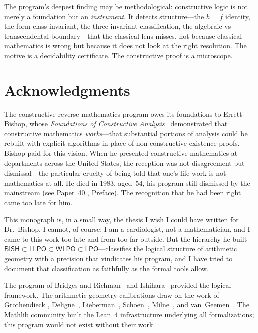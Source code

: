 \documentclass[11pt]{article}
\theoremstyle{plain}
\theoremstyle{definition}
\theoremstyle{remark}
\newcommand{\BISH}{\mathsf{BISH}}
\newcommand{\LPO}{\mathsf{LPO}}
\newcommand{\WLPO}{\mathsf{WLPO}}
\newcommand{\LLPO}{\mathsf{LLPO}}
\begin{document}
The program's deepest finding may be methodological:
constructive logic is not merely a foundation but an
\emph{instrument}.  It detects structure---the $h = f$ identity,
the form-class invariant, the three-invariant classification,
the algebraic-vs-transcendental boundary---that
the classical lens misses, not because classical mathematics is
wrong but because it does not look at the right resolution.  The
motive is a decidability certificate.  The constructive proof is a
microscope.


\section*{Acknowledgments}

The constructive reverse mathematics program owes its
foundations to Errett Bishop, whose \textit{Foundations of
Constructive Analysis}~\cite{Bishop1967} demonstrated that
constructive mathematics \emph{works}---that substantial portions
of analysis could be rebuilt with explicit algorithms in place of
non-constructive existence proofs.  Bishop paid for this vision.
When he presented constructive mathematics at departments across
the United States, the reception was not disagreement but
dismissal---the particular cruelty of being told that one's life
work is not mathematics at all.  He died in 1983, aged~54, his
program still dismissed by the mainstream (see Paper~40
\cite{Paper40}, Preface).  The recognition that he had been right
came too late for him.

This monograph is, in a small way, the thesis I wish I could
have written for Dr.~Bishop.  I cannot, of course: I am a
cardiologist, not a mathematician, and I came to this work too
late and from too far outside.  But the hierarchy he built---$\BISH
\subset \LLPO \subset \WLPO \subset \LPO$---classifies the
logical structure of arithmetic geometry with a precision that
vindicates his program, and I have tried to document that
classification as faithfully as the formal tools allow.

The program of Bridges and Richman~\cite{BridgesRichman1987} and
Ishihara~\cite{Ishihara2006} provided the logical framework.  The
arithmetic geometry calibrations draw on the work of Grothendieck
\cite{Grothendieck1969}, Deligne~\cite{Deligne1980},
Lieberman~\cite{Lieberman1968}, Schoen~\cite{Schoen1998},
Milne~\cite{Milne1999}, and van~Geemen~\cite{vanGeemen2005}.  The
Mathlib community built the Lean~4 infrastructure underlying all
formalizations; this program would not exist without their work.
\end{document}
